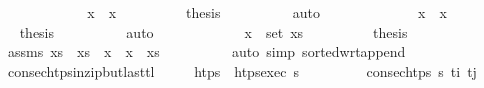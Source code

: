 \begin{isabellebody}
\ \ \ \ \isamarkupfalse%
\isanewline
\ \ \ \ \ \ \isamarkupfalse%
\ {\isachardoublequoteopen}x\ {\isacharequal}{\kern0pt}\ x\isanewline
\ \ \ \ \ \ \isamarkupfalse%
\ \isamarkupfalse%
\ {\isacharquery}{\kern0pt}thesis\isanewline
\ \ \ \ \ \ \ \ \isamarkupfalse%
\ auto\isanewline
\ \ \ \ \isamarkupfalse%
\isanewline
\ \ \ \ \ \ \isamarkupfalse%
\ {\isachardoublequoteopen}\ x\ {\isacharequal}{\kern0pt}\ x\isanewline
\ \ \ \ \ \ \isamarkupfalse%
\ \isamarkupfalse%
\ {\isacharquery}{\kern0pt}thesis\isanewline
\ \ \ \ \ \ \ \ \isamarkupfalse%
\ auto\isanewline
\ \ \ \ \isamarkupfalse%
\isanewline
\ \ \ \ \ \ \isamarkupfalse%
\ {\isachardoublequoteopen}x\ {\isasymin}\ set\ xs\isanewline
\ \ \ \ \ \ \isamarkupfalse%
\ \isamarkupfalse%
\ {\isacharquery}{\kern0pt}thesis\isanewline
\ \ \ \ \ \ \ \ \isamarkupfalse%
\ assms\ {\isacartoucheopen}xs\ {\isacharequal}{\kern0pt}\ xs\ {\isacharat}{\kern0pt}\ x\ {\isacharhash}{\kern0pt}\ x\ {\isacharhash}{\kern0pt}\ xs\isanewline
\ \ \ \ \ \ \ \ \isamarkupfalse%
\ {\isacharparenleft}{\kern0pt}auto\ simp{\isacharcolon}{\kern0pt}\ sorted{\isacharunderscore}{\kern0pt}wrt{\isacharunderscore}{\kern0pt}append{\isacharparenright}{\kern0pt}\isanewline
\ \ \ \ \isamarkupfalse%
\isanewline
\ \ \isamarkupfalse%
%
\endisatagproof
{\isafoldproof}%
%
\isadelimproof
\isanewline
%
\endisadelimproof
\isanewline
\ \ \isamarkupfalse%
\ consec{\isacharunderscore}{\kern0pt}htps{\isacharunderscore}{\kern0pt}in{\isacharunderscore}{\kern0pt}zip{\isacharunderscore}{\kern0pt}butlast{\isacharunderscore}{\kern0pt}tl{\isacharcolon}{\kern0pt}\isanewline
\ \ \ \ \ {\isachardoublequoteopen}htps\ {\isacharequal}{\kern0pt}\ htps{\isacharunderscore}{\kern0pt}exec\ {\isasympi}s{\isachardoublequoteclose}\isanewline
\ \ \ \ \ \ \ \ \ {\isachardoublequoteopen}consec{\isacharunderscore}{\kern0pt}htps\ {\isasympi}s\ t\isactrlsub i\ t\isactrlsub j{\isachardoublequoteclose}\isanewline

\end{isabellebody}
